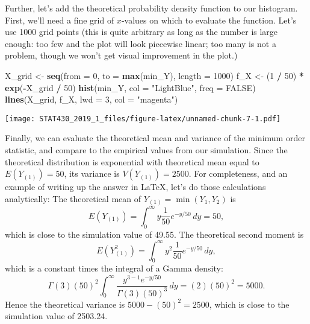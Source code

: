 \documentclass[]{article}
\newenvironment{Shaded}{\begin{snugshade}}{\end{snugshade}}
\newcommand{\KeywordTok}[1]{\textcolor[rgb]{0.13,0.29,0.53}{\textbf{#1}}}
\newcommand{\DataTypeTok}[1]{\textcolor[rgb]{0.13,0.29,0.53}{#1}}
\newcommand{\DecValTok}[1]{\textcolor[rgb]{0.00,0.00,0.81}{#1}}
\newcommand{\StringTok}[1]{\textcolor[rgb]{0.31,0.60,0.02}{#1}}
\newcommand{\OtherTok}[1]{\textcolor[rgb]{0.56,0.35,0.01}{#1}}
\newcommand{\OperatorTok}[1]{\textcolor[rgb]{0.81,0.36,0.00}{\textbf{#1}}}
\newcommand{\NormalTok}[1]{#1}
\begin{document}
Further, let's add the theoretical probability density function to our
histogram. First, we'll need a fine grid of \(x\)-values on which to
evaluate the function. Let's use 1000 grid points (this is quite
arbitrary as long as the number is large enough: too few and the plot
will look piecewise linear; too many is not a problem, though we won't
get visual improvement in the plot.)

\begin{Shaded}
\begin{Highlighting}[]
\NormalTok{X_grid <-}\StringTok{ }\KeywordTok{seq}\NormalTok{(}\DataTypeTok{from =} \DecValTok{0}\NormalTok{, }\DataTypeTok{to =} \KeywordTok{max}\NormalTok{(min_Y), }\DataTypeTok{length =} \DecValTok{1000}\NormalTok{)}
\NormalTok{f_X <-}\StringTok{ }\NormalTok{(}\DecValTok{1} \OperatorTok{/}\StringTok{ }\DecValTok{50}\NormalTok{) }\OperatorTok{*}\StringTok{ }\KeywordTok{exp}\NormalTok{(}\OperatorTok{-}\NormalTok{X_grid }\OperatorTok{/}\StringTok{ }\DecValTok{50}\NormalTok{)}
\KeywordTok{hist}\NormalTok{(min_Y, }\DataTypeTok{col =} \StringTok{"LightBlue"}\NormalTok{, }\DataTypeTok{freq =} \OtherTok{FALSE}\NormalTok{) }
\KeywordTok{lines}\NormalTok{(X_grid, f_X, }\DataTypeTok{lwd =} \DecValTok{3}\NormalTok{, }\DataTypeTok{col =} \StringTok{"magenta"}\NormalTok{)}
\end{Highlighting}
\end{Shaded}

\texttt{[image: STAT430\_2019\_1\_files/figure-latex/unnamed-chunk-7-1.pdf]}

Finally, we can evaluate the theoretical mean and variance of the
minimum order statistic, and compare to the empirical values from our
simulation. Since the theoretical distribution is exponential with
theoretical mean equal to \(E(Y_{(1)})=50\), its variance is
\(V(Y_{(1)})=2500\). For completeness, and an example of writing up the
answer in \LaTeX, let's do those calculations analytically: The
theoretical mean of \(Y_{(1)}=\min(Y_1,Y_2)\) is \[
E(Y_{(1)})=\int_0^\infty y\frac{1}{50}e^{-y/50}\,dy=50, 
\] which is close to the simulation value of 49.55. The theoretical
second moment is \[
E(Y_{(1)}^2)=\int_0^\infty y^2\frac{1}{50} e^{-y/50}\,dy, 
\] which is a constant times the integral of a Gamma density: \[
\Gamma(3)(50)^2\int_0^\infty \frac{y^{3-1} e^{-y/50}}{\Gamma(3)(50)^3}\,dy=(2)(50)^2=5000.
\] Hence the theoretical variance is \(5000-(50)^2=2500\), which is
close to the simulation value of 2503.24.
\end{document}
